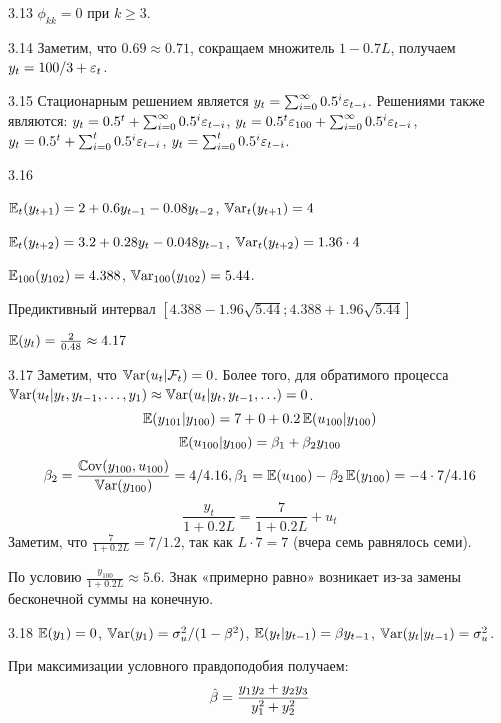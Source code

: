 \begin{solution}{{3.13}}
  $\phi_{kk}=0$ при $k \geq 3$.
\end{solution}
\protect \hypertarget {soln:3.14}{}
\begin{solution}{{3.14}}
Заметим, что $0.69\approx 0.71$, сокращаем множитель $1-0.7L$, получаем $y_t = 100/3 + \varepsilon_t$.
\end{solution}
\protect \hypertarget {soln:3.15}{}
\begin{solution}{{3.15}}
Стационарным решением является $y_t = \sum_{i=0}^{\infty} 0.5^i \varepsilon_{t-i}$. Решениями также являются: $y_t = 0.5^t + \sum_{i=0}^{\infty} 0.5^i \varepsilon_{t-i}$, $y_t = 0.5^t\varepsilon_{100} + \sum_{i=0}^{\infty} 0.5^i \varepsilon_{t-i}$, $y_t = 0.5^t + \sum_{i=0}^{t} 0.5^i \varepsilon_{t-i}$, $y_t = \sum_{i=0}^{t} 0.5^i \varepsilon_{t-i}$.
\end{solution}
\protect \hypertarget {soln:3.16}{}
\begin{solution}{{3.16}}

$\operatorname{\mathbb{E}}_t(y_{t+1})=2+0.6y_{t-1}-0.08y_{t-2}$, $\operatorname{\mathbb{V}\mathrm{ar}}_t(y_{t+1})=4$

$\operatorname{\mathbb{E}}_t(y_{t+2})=3.2 + 0.28 y_t- 0.048y_{t-1}$, $\operatorname{\mathbb{V}\mathrm{ar}}_t(y_{t+2})=1.36 \cdot 4$

$\operatorname{\mathbb{E}}_{100}(y_{102})= 4.388$, $\operatorname{\mathbb{V}\mathrm{ar}}_{100}(y_{102})=5.44$.

Предиктивный интервал $[4.388 - 1.96 \sqrt{5.44};4.388 + 1.96 \sqrt{5.44}]$

$\operatorname{\mathbb{E}}(y_t)=\frac{2}{0.48}\approx 4.17$

\end{solution}
\protect \hypertarget {soln:3.17}{}
\begin{solution}{{3.17}}
Заметим, что $\operatorname{\mathbb{V}\mathrm{ar}}(u_t|\mathcal{F}_t)=0$. Более того, для обратимого процесса $\operatorname{\mathbb{V}\mathrm{ar}}(u_t|y_t, y_{t-1}, \ldots, y_1) \approx \operatorname{\mathbb{V}\mathrm{ar}}(u_t|y_t, y_{t-1}, \ldots) = 0$.
\[
\operatorname{\mathbb{E}}(y_{101}|y_{100})=7 + 0 + 0.2\operatorname{\mathbb{E}}(u_{100}|y_{100})
\]
\[
\operatorname{\mathbb{E}}(u_{100}|y_{100}) = \beta_1 + \beta_2 y_{100}
\]
\[
\beta_2 = \frac{\operatorname{\mathbb{C}\mathrm{ov}}(y_{100}, u_{100})}{\operatorname{\mathbb{V}\mathrm{ar}}(y_{100})}=4/4.16, \beta_1 = \operatorname{\mathbb{E}}(u_{100}) - \beta_2 \operatorname{\mathbb{E}}(y_{100})=-4\cdot 7/4.16
\]
\[
\frac{y_t}{1+0.2L} = \frac{7}{1+0.2L} + u_t
\]
Заметим, что $\frac{7}{1+0.2L}=7/1.2$, так как $L\cdot 7 = 7$ (вчера семь равнялось семи).

По условию $\frac{y_{100}}{1+0.2L} \approx 5.6$. Знак «примерно равно» возникает из-за замены бесконечной суммы на конечную.

\end{solution}
\protect \hypertarget {soln:3.18}{}
\begin{solution}{{3.18}}
    $\operatorname{\mathbb{E}}(y_1)=0$, $\operatorname{\mathbb{V}\mathrm{ar}}(y_1)=\sigma^2_u/(1-\beta^2)$, $\operatorname{\mathbb{E}}(y_t|y_{t-1})=\beta y_{t-1}$, $\operatorname{\mathbb{V}\mathrm{ar}}(y_t|y_{t-1})=\sigma^2_u$.

    При максимизации условного правдоподобия получаем:
    \[
         \hat{\beta} = \frac{y_1 y_2 + y_2 y_3}{y_1^2 + y_2^2}
    \]
  
\end{solution}
